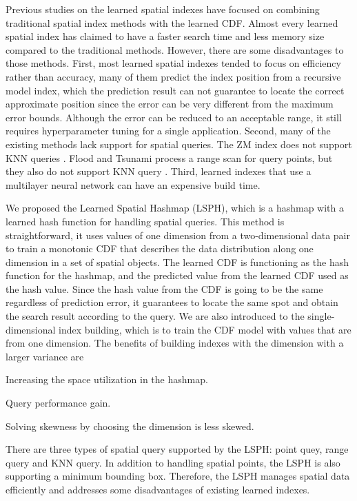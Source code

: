 Previous studies on the learned spatial indexes have focused on combining traditional spatial index methods with the learned CDF. Almost every learned spatial index has claimed to have a faster search time and less memory size compared to the traditional methods. However, there are some disadvantages to those methods. First, most learned spatial indexes tended to focus on efficiency rather than accuracy, many of them predict the index position from a recursive model index, which the prediction result can not guarantee to locate the correct approximate position since the error can be very different from the maximum error bounds. Although the error can be reduced to an acceptable range, it still requires hyperparameter tuning for a single application.  Second, many of the existing methods lack support for spatial queries. The ZM index does not support KNN queries \cite{Wang:2019ks}. Flood and Tsunami process a range scan for query points, but they also do not support KNN query \cite{Nathan:2019wc, Ding:2020we}. Third, learned indexes that use a multilayer neural network can have an expensive build time. 

We proposed the Learned Spatial Hashmap (LSPH), which is a hashmap with a learned hash function for handling spatial queries. This method is straightforward, it uses values of one dimension from a two-dimensional data pair to train a monotonic CDF that describes the data distribution along one dimension in a set of spatial objects.  The learned CDF is functioning as the hash function for the hashmap, and the predicted value from the learned CDF used as the hash value. Since the hash value from the CDF is going to be the same regardless of prediction error, it guarantees to locate the same spot and obtain the search result according to the query. We are also introduced to the single-dimensional index building, which is to train the CDF model with values that are from one dimension. The benefits of building indexes with the dimension with a larger variance are 
\begin{enumerate*}
  \item Increasing the space utilization in the hashmap.
  \item Query performance gain.
  \item Solving skewness by choosing the dimension is less skewed.
\end{enumerate*}
There are three types of spatial query supported by the LSPH: point quey, range query and KNN query. In addition to handling spatial points, the LSPH is also supporting a minimum bounding box. Therefore, the LSPH manages spatial data efficiently and addresses some disadvantages of existing learned indexes. 


